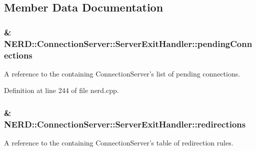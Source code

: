 \subsection{\-Member \-Data \-Documentation}
\hypertarget{classNERD_1_1ConnectionServer_1_1ServerExitHandler_a0953476221ba91597772e457b7357eae}{
\subsubsection[{pending\-Connections}]{\& {\bf \-N\-E\-R\-D\-::\-Connection\-Server\-::\-Server\-Exit\-Handler\-::pending\-Connections}}}
\label{classNERD_1_1ConnectionServer_1_1ServerExitHandler_a0953476221ba91597772e457b7357eae}


\-A reference to the containing \-Connection\-Server's list of pending connections. 



\-Definition at line 244 of file nerd.\-cpp.

\hypertarget{classNERD_1_1ConnectionServer_1_1ServerExitHandler_af4572dea480ca71da58a92ce88b8153e}{
\subsubsection[{redirections}]{\& {\bf \-N\-E\-R\-D\-::\-Connection\-Server\-::\-Server\-Exit\-Handler\-::redirections}}}
\label{classNERD_1_1ConnectionServer_1_1ServerExitHandler_af4572dea480ca71da58a92ce88b8153e}


\-A reference to the containing \-Connection\-Server's table of redirection rules. 



